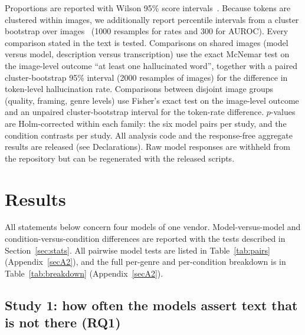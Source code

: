\documentclass[pdflatex,sn-mathphys-num]{sn-jnl}%
\theoremstyle{thmstyleone}%
\theoremstyle{thmstyletwo}%
\theoremstyle{thmstylethree}%
\begin{document}
Proportions are reported with Wilson 95\% score intervals~\cite{wilson1927probable}. Because tokens are clustered within images, we additionally report percentile intervals from a cluster bootstrap over images~\cite{efron1979bootstrap} (1000 resamples for rates and 300 for AUROC). Every comparison stated in the text is tested. Comparisons on shared images (model versus model, description versus transcription) use the exact McNemar test on the image-level outcome ``at least one hallucinated word'', together with a paired cluster-bootstrap 95\% interval (2000 resamples of images) for the difference in token-level hallucination rate. Comparisons between disjoint image groups (quality, framing, genre levels) use Fisher's exact test on the image-level outcome and an unpaired cluster-bootstrap interval for the token-rate difference. $p$-values are Holm-corrected within each family: the six model pairs per study, and the condition contrasts per study. All analysis code and the response-free aggregate results are released (see Declarations). Raw model responses are withheld from the repository but can be regenerated with the released scripts.


\section{Results}\label{sec:results}

All statements below concern four models of one vendor. Model-versus-model and condition-versus-condition differences are reported with the tests described in Section~\ref{sec:stats}. All pairwise model tests are listed in Table~\ref{tab:pairs} (Appendix~\ref{secA2}), and the full per-genre and per-condition breakdown is in Table~\ref{tab:breakdown} (Appendix~\ref{secA2}).

\subsection{Study 1: how often the models assert text that is not there (RQ1)}\label{sec:rq1}
\end{document}
